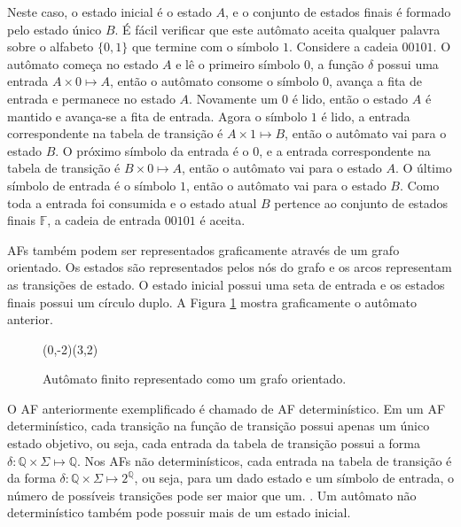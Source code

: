 \documentclass[12pt,a4paper]{article}
\begin{document}
Neste caso, o estado inicial é o estado $A$, e o conjunto de estados finais
é formado pelo estado único $B$. É fácil verificar que este autômato aceita
qualquer palavra sobre o alfabeto $\{0,1\}$ que termine com o símbolo $1$.
Considere a cadeia $00101$. O autômato começa no estado $A$ e lê o primeiro
símbolo $0$, a função $\delta$ possui uma entrada $A \times 0 \mapsto A$,
então o autômato consome o símbolo $0$, avança a fita de entrada e permanece
no estado $A$. Novamente um $0$ é lido, então o estado $A$ é mantido e
avança-se a fita de entrada. Agora o símbolo $1$ é lido, a entrada correspondente
na tabela de transição é $A \times 1 \mapsto B$, então o autômato vai para
o estado $B$. O próximo símbolo da entrada é o $0$, e a entrada correspondente
na tabela de transição é $B \times 0 \mapsto A$, então o autômato vai para o
estado $A$. O último símbolo de entrada é o símbolo $1$, então o autômato vai
para o estado $B$. Como toda a entrada foi consumida e o estado atual $B$
pertence ao conjunto de estados finais $\mathbb{F}$, a cadeia de entrada $00101$ é
aceita.

AFs também podem ser representados graficamente através de
um grafo orientado. Os estados são representados pelos nós do grafo
e os arcos representam as transições de estado. O estado inicial possui
uma seta de entrada e os estados finais possui um círculo duplo. A
Figura \ref{fig:automata} mostra graficamente o autômato anterior.

\begin{figure}[htp]
\begin{center}
\begin{VCPicture}{(0,-2)(3,2)}
 
 
 
\end{VCPicture}
\caption{Autômato finito representado como um grafo orientado.}
\label{fig:automata}
\end{center}
\end{figure}

O AF anteriormente exemplificado é chamado de AF determinístico.
Em um AF determinístico, cada transição na função de transição possui apenas
um único estado objetivo, ou seja, cada entrada da tabela de transição possui a forma
$\delta: \mathbb{Q} \times \Sigma \mapsto \mathbb{Q}$. Nos AFs não
determinísticos, cada entrada na tabela de transição é da forma
$\delta: \mathbb{Q} \times \Sigma \mapsto 2^{\mathbb{Q}}$,
ou seja, para um dado estado e um símbolo de entrada, o número de possíveis
transições pode ser maior que um. .  Um autômato não
determinístico também pode possuir mais de um estado inicial.
\end{document}

